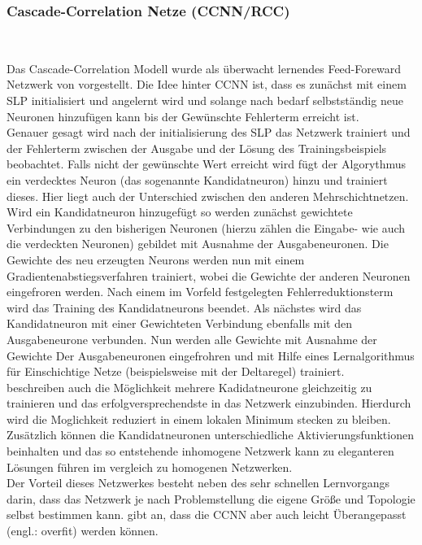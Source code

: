 

\subsubsection{Cascade-Correlation Netze (CCNN/RCC)}\\

Das Cascade-Correlation Modell wurde als überwacht lernendes Feed-Foreward Netzwerk von \citet{Fahlman1990} vorgestellt. Die Idee hinter CCNN ist, dass es zunächst mit einem SLP initialisiert und angelernt wird und solange nach bedarf selbstständig neue Neuronen hinzufügen kann bis der Gewünschte Fehlerterm erreicht ist.\\
Genauer gesagt wird nach der initialisierung des SLP das Netzwerk trainiert und der Fehlerterm zwischen der Ausgabe und der Lösung des Trainingsbeispiels beobachtet. Falls nicht der gewünschte Wert erreicht wird fügt der Algorythmus ein verdecktes Neuron (das sogenannte Kandidatneuron) hinzu und trainiert dieses. Hier liegt auch der Unterschied zwischen den anderen Mehrschichtnetzen. Wird ein Kandidatneuron hinzugefügt so werden zunächst gewichtete Verbindungen zu den bisherigen Neuronen (hierzu zählen die Eingabe- wie auch die verdeckten Neuronen) gebildet mit Ausnahme der Ausgabeneuronen. Die Gewichte des neu erzeugten Neurons werden nun mit einem Gradientenabstiegsverfahren trainiert, wobei die Gewichte der anderen Neuronen eingefroren werden. Nach einem im Vorfeld festgelegten Fehlerreduktionsterm wird das Training des Kandidatneurons beendet. Als nächstes wird das Kandidatneuron mit einer Gewichteten Verbindung ebenfalls mit den Ausgabeneurone verbunden. Nun werden alle Gewichte mit Ausnahme der Gewichte Der Ausgabeneuronen eingefrohren und mit Hilfe eines Lernalgorithmus für Einschichtige Netze (beispielsweise mit der Deltaregel) trainiert.\\
\citet{Fahlman1990} beschreiben auch die Möglichkeit mehrere Kadidatneurone gleichzeitig zu trainieren und das erfolgversprechendste in das Netzwerk einzubinden. Hierdurch wird die Moglichkeit reduziert in einem lokalen Minimum stecken zu bleiben. Zusätzlich können die Kandidatneuronen unterschiedliche Aktivierungsfunktionen beinhalten und das so entstehende inhomogene Netzwerk kann zu eleganteren Lösungen führen im vergleich zu homogenen Netzwerken.\\
Der Vorteil dieses Netzwerkes besteht neben des sehr schnellen Lernvorgangs darin, dass das Netzwerk je nach Problemstellung die eigene Größe und Topologie selbst bestimmen kann. \citet{Balazs2009} gibt an, dass die CCNN aber auch leicht Überangepasst (engl.: overfit) werden können.\\
